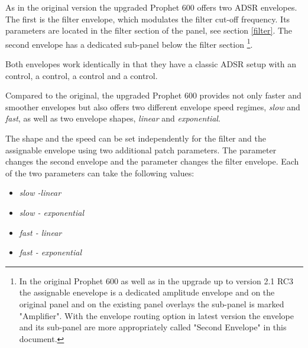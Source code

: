 As in the original version the upgraded Prophet 600 offers two ADSR envelopes. The first is the filter envelope, which modulates the filter cut-off frequency. Its parameters are located in the filter section of the panel, see section \ref{filter}. The second envelope has a dedicated sub-panel below the filter section \footnote{In the original Prophet 600 as well as in the upgrade up to version 2.1 RC3 the assignable enevelope is a dedicated amplitude envelope and on the original panel and on the existing panel overlays the sub-panel is marked "Amplifier". With the envelope routing option in latest version the envelope and its sub-panel are more appropriately called "Second Envelope" in this document.}.

Both envelopes work identically in that they have a classic ADSR setup with an \attack control, a \decay control, a \sustain control and a \release control. 

\begin{center}
\end{center}

Compared to the original, the upgraded Prophet 600 provides not only faster and smoother envelopes but also offers two different envelope speed regimes, \textit{slow} and \textit{fast}, as well as two envelope shapes, \textit{linear} and \textit{exponential}.

The shape and the speed can be set independently for the filter and the assignable envelope using two additional patch parameters. The parameter \secndenv changes the second envelope and the parameter \filenv changes the filter envelope. Each of the two parameters can take the following values:

\begin{itemize}
  \setlength\itemsep{0cm}
  \item \textit{slow -linear}
  \item \textit{slow - exponential}
  \item \textit{fast - linear}
  \item \textit{fast - exponential}
\end{itemize}
 

